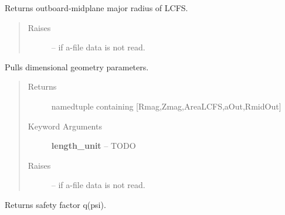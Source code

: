 \documentclass[letterpaper,10pt,english]{sphinxmanual}
\begin{document}
\begin{fulllineitems}
\begin{fulllineitems}
\end{fulllineitems}


\begin{fulllineitems}
\label{eqtools:eqtools.eqdskreader.EqdskReader.getRmidOut}
Returns outboard-midplane major radius of LCFS.
\begin{quote}\begin{description}
\item[{Raises }] \leavevmode
{} -- 
if a-file data is not read.

\end{description}\end{quote}

\end{fulllineitems}


\begin{fulllineitems}
\label{eqtools:eqtools.eqdskreader.EqdskReader.getGeometry}
Pulls dimensional geometry parameters.
\begin{quote}\begin{description}
\item[{Returns}] \leavevmode
namedtuple containing {[}Rmag,Zmag,AreaLCFS,aOut,RmidOut{]}

\item[{Keyword Arguments}] \leavevmode
\textbf{length\_unit} --
TODO

\item[{Raises }] \leavevmode
{} -- 
if a-file data is not read.

\end{description}\end{quote}

\end{fulllineitems}


\begin{fulllineitems}
\label{eqtools:eqtools.eqdskreader.EqdskReader.getQProfile}
Returns safety factor q(psi).

\end{fulllineitems}


\end{fulllineitems}
\end{document}
